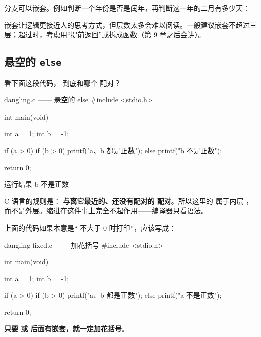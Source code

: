 分支可以嵌套。例如判断一个年份是否是闰年，再判断这一年的二月有多少天：


嵌套让逻辑更接近人的思考方式，但层数太多会难以阅读。一般建议嵌套不超过三层；超过时，考虑用“提前返回”或拆成函数（第 9 章之后会讲）。

\subsection{悬空的 \texttt{else}}

看下面这段代码， 到底和哪个  配对？

\begin{codebox}{dangling.c —— 悬空的 else}
#include <stdio.h>

int main(void)
{
    int a = 1;
    int b = -1;

    if (a > 0)
        if (b > 0)
            printf("a、b 都是正数\n");
    else
        printf("b 不是正数\n");

    return 0;
}
\end{codebox}

\begin{outbox}{运行结果}
b 不是正数
\end{outbox}

C 语言的规则是：\textbf{ 与离它最近的、还没有配对的  配对}。所以这里的  属于内层 ，而不是外层。缩进在这件事上完全不起作用——编译器只看语法。

\begin{pitfall}[用花括号消灭歧义]
上面的代码如果本意是“ 不大于 0 时打印”，应该写成：
\begin{codebox}{dangling-fixed.c —— 加花括号}
#include <stdio.h>

int main(void)
{
    int a = 1;
    int b = -1;

    if (a > 0) {
        if (b > 0) {
            printf("a、b 都是正数\n");
        }
    } else {
        printf("a 不是正数\n");
    }

    return 0;
}
\end{codebox}
\textbf{只要  或  后面有嵌套，就一定加花括号}。
\end{pitfall}

